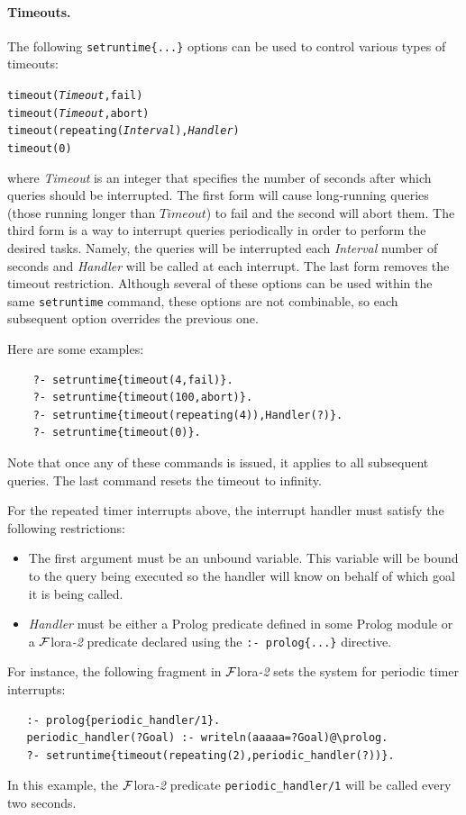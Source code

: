 \documentclass[11pt]{article}
\newcommand{\FLSYSTEM}{{\mbox{\sc ${\cal F}${lora}\rm\emph{-2}}}\xspace}
\begin{document}
\paragraph{Timeouts.} The following \texttt{setruntime\{...\}} options
can be used to control various types of timeouts:
\begin{alltt}
    timeout(\emph{Timeout},fail)
    timeout(\emph{Timeout},abort)
    timeout(repeating(\emph{Interval}),\emph{Handler})
    timeout(0)
\end{alltt}
where \emph{Timeout} is an integer that specifies the number of seconds after
which queries should be interrupted. The first form will cause long-running
queries (those running longer than $Timeout$) to fail and the second will
abort them.
The third form is a way to interrupt queries periodically in order to
perform the desired tasks. Namely, the queries will be interrupted each
\emph{Interval} number of seconds and \emph{Handler} will be called at each
interrupt.
The last form removes the timeout restriction.
Although several of these options can be used within the same
\texttt{setruntime} command, these options are not combinable, so each
subsequent option overrides the previous one. 

Here are some examples:
\begin{verbatim}
    ?- setruntime{timeout(4,fail)}.
    ?- setruntime{timeout(100,abort)}.
    ?- setruntime{timeout(repeating(4)),Handler(?)}.
    ?- setruntime{timeout(0)}.
\end{verbatim}
Note that once any of these commands is issued, it applies to all
subsequent queries.  The last command resets the timeout to infinity.

For the repeated timer interrupts above, the interrupt handler must
satisfy the following restrictions:
\begin{itemize}
\item   The first argument must be an unbound variable. This variable will
  be bound to the query being executed so the handler will know on behalf
  of which goal it is being called.
\item \emph{Handler} must be either a Prolog predicate defined in some
  Prolog module or a \FLSYSTEM predicate declared using the \texttt{:-
    prolog\{...\}}  
  directive. 
\end{itemize}
For instance, the following fragment in \FLSYSTEM sets the system for periodic
timer interrupts:
\begin{verbatim}
   :- prolog{periodic_handler/1}.
   periodic_handler(?Goal) :- writeln(aaaaa=?Goal)@\prolog.
   ?- setruntime{timeout(repeating(2),periodic_handler(?))}.
\end{verbatim}
In this example, the \FLSYSTEM predicate \texttt{periodic\_handler/1} will be
called every two seconds. 
\end{document}
